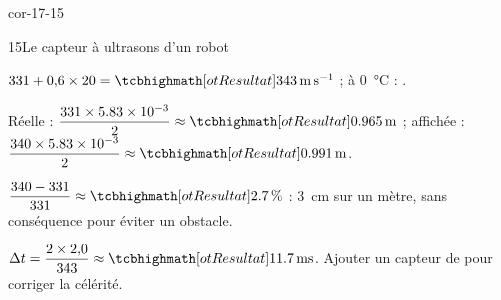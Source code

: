 \begin{blocLivre}{cor-17-15}
\begin{corrige}{15}{Le capteur à ultrasons d'un robot}
\begin{questions}
\item $331+0{,}6\times20=\res{\qty{343}{m.s^{-1}}}$ ; à \qty{0}{\degreeCelsius} : .
\item Réelle : $\dfrac{331\times\num{5,83e-3}}{2}\approx\res{\qty{0,965}{m}}$ ; affichée : $\dfrac{340\times\num{5,83e-3}}{2}\approx\res{\qty{0,991}{m}}$.
\item $\dfrac{340-331}{331}\approx\res{\qty{2,7}{\percent}}$ : \qty{3}{cm} sur un mètre, sans conséquence pour éviter un obstacle.
\item $\Delta t=\dfrac{2\times2{,}0}{343}\approx\res{\qty{11,7}{ms}}$. Ajouter un capteur de  pour corriger la célérité.
\end{questions}
\end{corrige}
\end{blocLivre}
